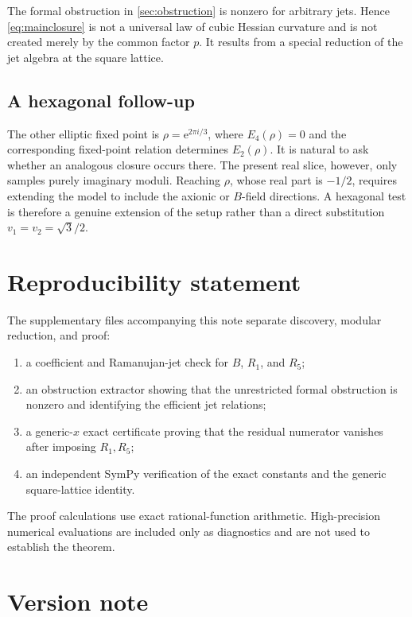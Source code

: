 \documentclass[11pt]{article}
\theoremstyle{definition}
\theoremstyle{remark}
\newcommand{\e}{\mathrm{e}}
\begin{document}
The formal obstruction in \cref{sec:obstruction} is nonzero for arbitrary jets. Hence \eqref{eq:mainclosure} is not a universal law of cubic Hessian curvature and is not created merely by the common factor \(p\). It results from a special reduction of the jet algebra at the square lattice.

\subsection{A hexagonal follow-up}

The other elliptic fixed point is \(\rho=\e^{2\pi i/3}\), where \(E_4(\rho)=0\) and the corresponding fixed-point relation determines \(E_2(\rho)\). It is natural to ask whether an analogous closure occurs there. The present real slice, however, only samples purely imaginary moduli. Reaching \(\rho\), whose real part is \(-1/2\), requires extending the model to include the axionic or \(B\)-field directions. A hexagonal test is therefore a genuine extension of the setup rather than a direct substitution \(v_1=v_2=\sqrt3/2\).

\section{Reproducibility statement}\label{sec:repro}

The supplementary files accompanying this note separate discovery, modular reduction, and proof:
\begin{enumerate}[label=\arabic*.]
 \item a coefficient and Ramanujan-jet check for \(B\), \(R_1\), and \(R_5\);
 \item an obstruction extractor showing that the unrestricted formal obstruction is nonzero and identifying the efficient jet relations;
 \item a generic-\(x\) exact certificate proving that the residual numerator vanishes after imposing \(R_1,R_5\);
 \item an independent SymPy verification of the exact constants and the generic square-lattice identity.
\end{enumerate}
The proof calculations use exact rational-function arithmetic. High-precision numerical evaluations are included only as diagnostics and are not used to establish the theorem.

\section*{Version note}
\end{document}
